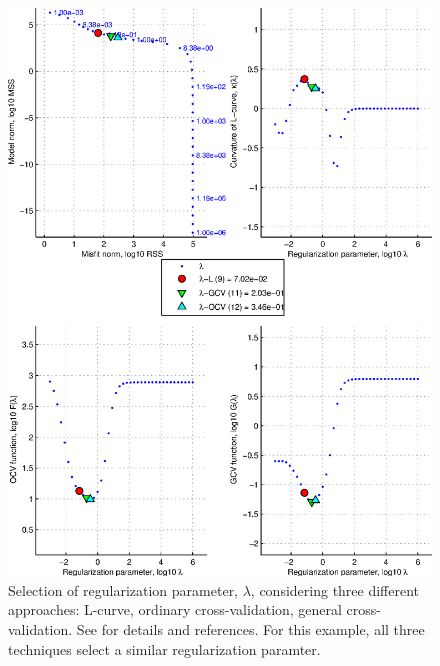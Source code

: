 \documentclass[11pt,titlepage,fleqn]{article}
\begin{document}
\begin{figure}
\includegraphics[width=16cm]{fig1D_4.eps}
\caption[]
{{
Selection of regularization parameter, $\lambda$, considering three different approaches: L-curve, ordinary cross-validation, general cross-validation. See \citet{Tape2009gps} for details and references. For this example, all three techniques select a similar regularization paramter.
\label{fig:1D_4}
}}
\end{figure}
\end{document}
